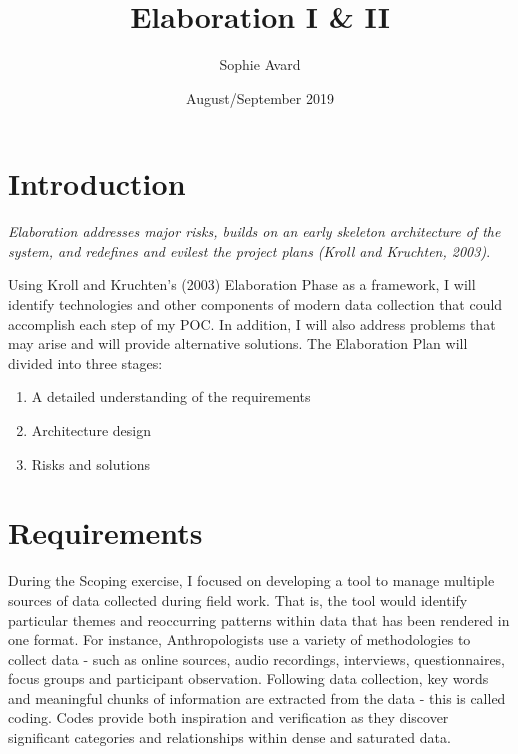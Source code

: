 \documentclass{article}
\title{Elaboration I & II}
\author{Sophie Avard }
\date{August/September 2019}
\begin{document}
\maketitle

\tableofcontents
\pagebreak

\section{Introduction}
\begin{center}
\textit{Elaboration addresses major risks, builds on an early skeleton architecture of the system, and redefines and evilest the project plans (Kroll and Kruchten, 2003)}.
\end{center}

Using Kroll and Kruchten’s (2003) Elaboration Phase as a framework, I will identify technologies and other components of modern data collection that could accomplish each step of my POC. In addition, I will also address problems that may arise and will provide alternative solutions. The Elaboration Plan will divided into three stages:
\begin{enumerate}
    \item A detailed understanding of the requirements
    \item Architecture design 
    \item Risks and solutions
\end{enumerate}

\section{Requirements}
During the Scoping exercise, I focused on developing a tool to manage multiple sources of data collected during field work. That is, the tool would identify particular themes and reoccurring patterns within data that has been rendered in one format. For instance, Anthropologists use a variety of methodologies to collect data - such as online sources, audio recordings, interviews, questionnaires, focus groups and participant observation. Following data collection, key words and meaningful chunks of information are extracted from the data - this is called coding. Codes provide both inspiration and verification as they discover significant categories and relationships within dense and saturated data. 
\end{document}
